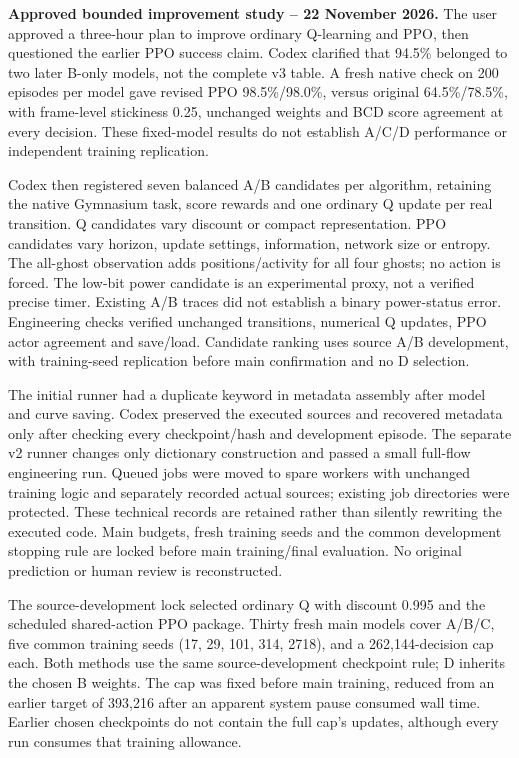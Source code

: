 \medskip
\noindent\textbf{Approved bounded improvement study -- 22 November 2026.}
The user approved a three-hour plan to improve ordinary Q-learning and PPO,
then questioned the earlier PPO success claim. Codex clarified that 94.5\%
belonged to two later B-only models, not the complete v3 table. A fresh native
check on 200 episodes per model gave revised PPO 98.5\%/98.0\%, versus original
64.5\%/78.5\%, with frame-level stickiness 0.25, unchanged weights and BCD score
agreement at every decision. These fixed-model results do not establish A/C/D
performance or independent training replication.

Codex then registered seven balanced A/B candidates per algorithm, retaining
the native Gymnasium task, score rewards and one ordinary Q update per real
transition. Q candidates vary discount or compact representation. PPO candidates
vary horizon, update settings, information, network size or entropy. The all-ghost
observation adds positions/activity for all four ghosts; no action is forced.
The low-bit power candidate is an experimental proxy, not a verified precise
timer. Existing A/B traces did not establish a binary power-status error.
Engineering checks verified unchanged transitions, numerical Q updates, PPO
actor agreement and save/load. Candidate ranking uses source A/B development,
with training-seed replication before main confirmation and no D selection.

The initial runner had a duplicate keyword in metadata assembly after model
and curve saving. Codex preserved the executed sources and recovered metadata
only after checking every checkpoint/hash and development episode. The separate
v2 runner changes only dictionary construction and passed a small full-flow
engineering run. Queued jobs were moved to spare workers with unchanged
training logic and separately recorded actual sources; existing job directories
were protected. These technical records are retained rather than silently
rewriting the executed code. Main budgets, fresh training seeds and the common
development stopping rule are locked before main training/final evaluation.
No original prediction or human review is reconstructed.

The source-development lock selected ordinary Q with discount 0.995 and the
scheduled shared-action PPO package. Thirty fresh main models cover A/B/C,
five common training seeds (17, 29, 101, 314, 2718), and a 262,144-decision
cap each. Both methods use the same source-development checkpoint rule;
D inherits the chosen B weights. The cap was fixed before main training,
reduced from an earlier target of 393,216 after an apparent system pause
consumed wall time. Earlier chosen checkpoints do not contain the full cap's
updates, although every run consumes that training allowance.

